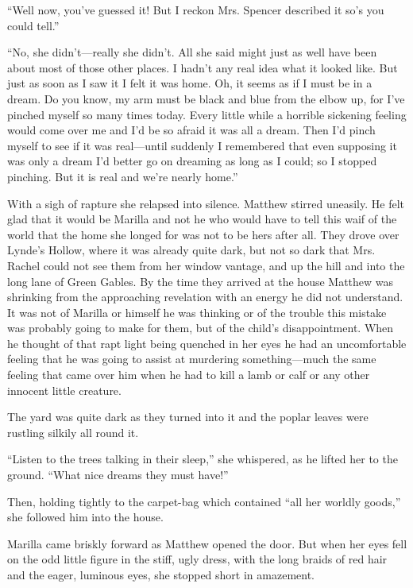 \documentclass[a4paper]{article}
\begin{document}
{\rmfamily ``Well now, you've guessed it! But I reckon Mrs. Spencer described it so's you could tell.''

``No, she didn't---really she didn't. All she said might just as well have been about most of those other places. I hadn't any real idea what it looked like. But just as soon as I saw it I felt it was home. Oh, it seems as if I must be in a dream. Do you know, my arm must be black and blue from the elbow up, for I've pinched myself so many times today. Every little while a horrible sickening feeling would come over me and I'd be so afraid it was all a dream. Then I'd pinch myself to see if it was real---until suddenly I remembered that even supposing it was only a dream I'd better go on dreaming as long as I could; so I stopped pinching. But it is real and we're nearly home.''}

With a sigh of rapture she relapsed into silence. Matthew stirred uneasily. He felt glad that it would be Marilla and not he who would have to tell this waif of the world that the home she longed for was not to be hers after all. They drove over Lynde's Hollow, where it was already quite dark, but not so dark that Mrs. Rachel could not see them from her window vantage, and up the hill and into the long lane of Green Gables. By the time they arrived at the house Matthew was shrinking from the approaching revelation with an energy he did not understand. It was not of Marilla or himself he was thinking or of the trouble this mistake was probably going to make for them, but of the child's disappointment. When he thought of that rapt light being quenched in her eyes he had an uncomfortable feeling that he was going to assist at murdering something---much the same feeling that came over him when he had to kill a lamb or calf or any other innocent little creature.

The yard was quite dark as they turned into it and the poplar leaves were rustling silkily all round it.

{\ttfamily ``Listen to the trees talking in their sleep,'' she whispered, as he lifted her to the ground. ``What nice dreams they must have!''

Then, holding tightly to the carpet-bag which contained ``all her worldly goods,'' she followed him into the house.}

Marilla came briskly forward as Matthew opened the door. But when her eyes fell on the odd little figure in the stiff, ugly dress, with the long braids of red hair and the eager, luminous eyes, she stopped short in amazement.
\end{document}
